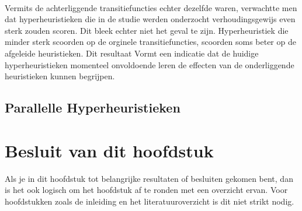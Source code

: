 \paragraph{}
Vermits de achterliggende transitiefuncties echter dezelfde waren, verwachtte men dat hyperheuristieken die in de studie werden onderzocht verhoudingsgewijs even sterk zouden scoren. Dit bleek echter niet het geval te zijn. Hyperheuristiek die minder sterk scoorden op de orginele transitiefuncties, scoorden soms beter op de afgeleide heuristieken. Dit resultaat Vormt een indicatie dat de huidige hyperheuristieken momenteel onvoldoende leren de effecten van de onderliggende heuristieken kunnen begrijpen.

\subsection{Parallelle Hyperheuristieken}




\section{Besluit van dit hoofdstuk}
Als je in dit hoofdstuk tot belangrijke resultaten of besluiten gekomen
bent, dan is het ook logisch om het hoofdstuk af te ronden met een
overzicht ervan. Voor hoofdstukken zoals de inleiding en het
literatuuroverzicht is dit niet strikt nodig.

